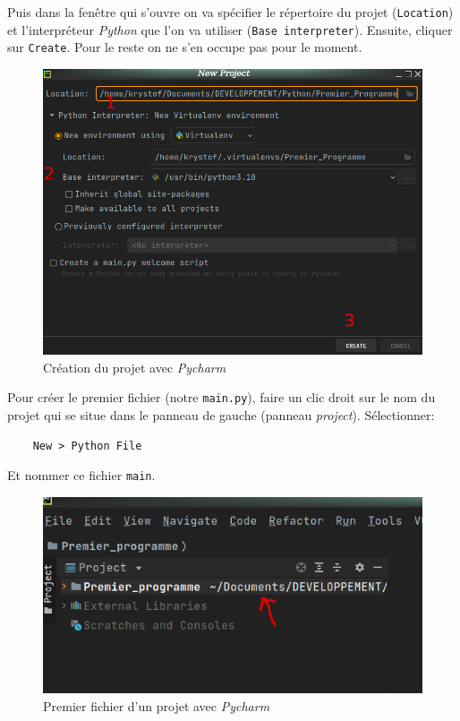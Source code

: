 \documentclass[a4paper,11pt]{book}
\begin{document}
Puis dans la fenêtre qui s'ouvre on va spécifier le répertoire du projet (\texttt{Location}) et l'interpréteur \textit{Python} que l'on va utiliser (\texttt{Base interpreter}). Ensuite, cliquer sur \texttt{Create}. Pour le reste on ne s'en occupe pas pour le moment.
\begin{figure}[h]
\begin{center}
\includegraphics[scale=0.25]{IMG/Pycharm-02.png}
\caption{Création du projet avec \textit{Pycharm}}
\end{center}
\end{figure}
\medskip

Pour créer le premier fichier (notre \texttt{main.py}), faire un clic droit sur le nom du projet qui se situe dans le panneau de gauche (panneau \textit{project}). Sélectionner:
\begin{verbatim}
    New > Python File
\end{verbatim} 
Et nommer ce fichier \texttt{main}.
\begin{figure}[h]
\begin{center}
\includegraphics[scale=0.5]{IMG/Pycharm-03.png}
\caption{Premier fichier d'un projet avec \textit{Pycharm}}
\end{center}
\end{figure}
\medskip
\end{document}
